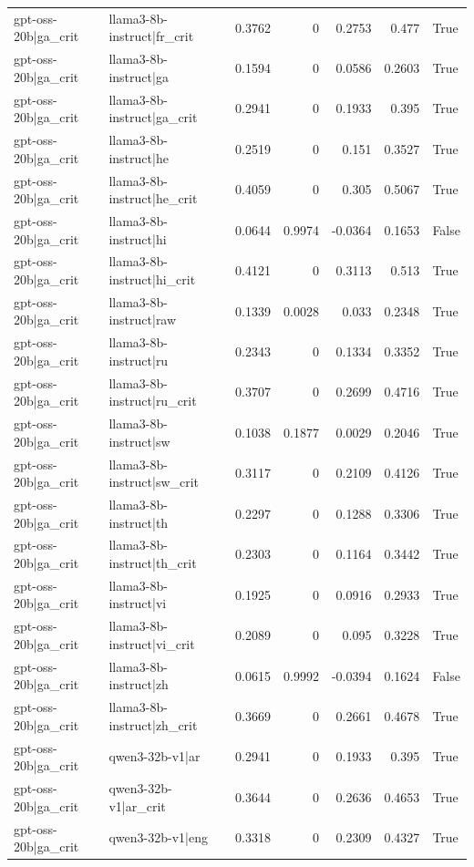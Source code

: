 \begin{table}
\begin{tabular}{l l r r r r l}
gpt-oss-20b|ga_crit & llama3-8b-instruct|fr_crit & 0.3762 & 0 & 0.2753 & 0.477 & True \\
gpt-oss-20b|ga_crit & llama3-8b-instruct|ga & 0.1594 & 0 & 0.0586 & 0.2603 & True \\
gpt-oss-20b|ga_crit & llama3-8b-instruct|ga_crit & 0.2941 & 0 & 0.1933 & 0.395 & True \\
gpt-oss-20b|ga_crit & llama3-8b-instruct|he & 0.2519 & 0 & 0.151 & 0.3527 & True \\
gpt-oss-20b|ga_crit & llama3-8b-instruct|he_crit & 0.4059 & 0 & 0.305 & 0.5067 & True \\
gpt-oss-20b|ga_crit & llama3-8b-instruct|hi & 0.0644 & 0.9974 & -0.0364 & 0.1653 & False \\
gpt-oss-20b|ga_crit & llama3-8b-instruct|hi_crit & 0.4121 & 0 & 0.3113 & 0.513 & True \\
gpt-oss-20b|ga_crit & llama3-8b-instruct|raw & 0.1339 & 0.0028 & 0.033 & 0.2348 & True \\
gpt-oss-20b|ga_crit & llama3-8b-instruct|ru & 0.2343 & 0 & 0.1334 & 0.3352 & True \\
gpt-oss-20b|ga_crit & llama3-8b-instruct|ru_crit & 0.3707 & 0 & 0.2699 & 0.4716 & True \\
gpt-oss-20b|ga_crit & llama3-8b-instruct|sw & 0.1038 & 0.1877 & 0.0029 & 0.2046 & True \\
gpt-oss-20b|ga_crit & llama3-8b-instruct|sw_crit & 0.3117 & 0 & 0.2109 & 0.4126 & True \\
gpt-oss-20b|ga_crit & llama3-8b-instruct|th & 0.2297 & 0 & 0.1288 & 0.3306 & True \\
gpt-oss-20b|ga_crit & llama3-8b-instruct|th_crit & 0.2303 & 0 & 0.1164 & 0.3442 & True \\
gpt-oss-20b|ga_crit & llama3-8b-instruct|vi & 0.1925 & 0 & 0.0916 & 0.2933 & True \\
gpt-oss-20b|ga_crit & llama3-8b-instruct|vi_crit & 0.2089 & 0 & 0.095 & 0.3228 & True \\
gpt-oss-20b|ga_crit & llama3-8b-instruct|zh & 0.0615 & 0.9992 & -0.0394 & 0.1624 & False \\
gpt-oss-20b|ga_crit & llama3-8b-instruct|zh_crit & 0.3669 & 0 & 0.2661 & 0.4678 & True \\
gpt-oss-20b|ga_crit & qwen3-32b-v1|ar & 0.2941 & 0 & 0.1933 & 0.395 & True \\
gpt-oss-20b|ga_crit & qwen3-32b-v1|ar_crit & 0.3644 & 0 & 0.2636 & 0.4653 & True \\
gpt-oss-20b|ga_crit & qwen3-32b-v1|eng & 0.3318 & 0 & 0.2309 & 0.4327 & True \\

\end{tabular}
\end{table}
